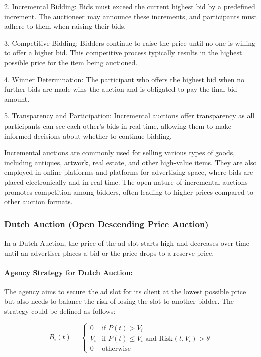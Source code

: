 2. Incremental Bidding: Bids must exceed the current highest bid by a predefined increment. The auctioneer may announce these increments, and participants must adhere to them when raising their bids.

3. Competitive Bidding: Bidders continue to raise the price until no one is willing to offer a higher bid. This competitive process typically results in the highest possible price for the item being auctioned.

4. Winner Determination: The participant who offers the highest bid when no further bids are made wins the auction and is obligated to pay the final bid amount.

5. Transparency and Participation: Incremental auctions offer transparency as all participants can see each other's bids in real-time, allowing them to make informed decisions about whether to continue bidding.

Incremental auctions are commonly used for selling various types of goods, including antiques, artwork, real estate, and other high-value items. They are also employed in online platforms and platforms for advertising space, where bids are placed electronically and in real-time. The open nature of incremental auctions promotes competition among bidders, often leading to higher prices compared to other auction formats.


\subsubsection{Dutch Auction (Open Descending Price Auction)}
In a Dutch Auction, the price of the ad slot starts high and decreases over time until an advertiser places a bid or the price drops to a reserve price.

\paragraph{Agency Strategy for Dutch Auction:} 
The agency aims to secure the ad slot for its client at the lowest possible price but also needs to balance the risk of losing the slot to another bidder. The strategy could be defined as follows:

\[
B_i(t) = 
\begin{cases} 
0 & \text{if } P(t) > V_i \\
V_i & \text{if } P(t) \leq V_i \text{ and } \text{Risk}(t, V_i) > \theta \\
0 & \text{otherwise}
\end{cases}
\]

